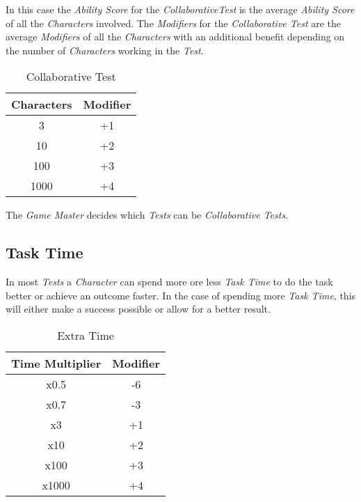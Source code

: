 In this case the \emph{Ability Score} for the \emph{CollaborativeTest} is the average
\emph{Ability Score} of all the \emph{Characters} involved. The \emph{Modifiers}
for the \emph{Collaborative Test} are the average
\emph{Modifiers} of all the \emph{Characters} with an additional benefit depending
on the number of \emph{Characters} working in the \emph{Test}.

\begin{table}[htb]
    \caption[CollaborativeTest]{Collaborative Test}
    \label{tab:team-play test}
    \centering
    \begin{tabular}{cc}
        \toprule
        \textbf{Characters} & \textbf{Modifier} \\
        \midrule
        3                   & +1                \\
        10                  & +2                \\
        100                 & +3                \\
        1000                & +4                \\
        \bottomrule
    \end{tabular}
\end{table}

The \emph{Game Master} decides which \emph{Tests} can be \emph{Collaborative Tests}.

\subsection{Task Time}

In most \emph{Tests} a \emph{Character} can spend more ore less \emph{Task Time} to
do the task better or achieve an outcome faster. In the case of spending more
\emph{Task Time}, this will either make a success possible or allow for a better
result.

\begin{table}[htb]
    \caption[Extra Time]{Extra Time}
    \label{tab:extra time}
    \centering
    \begin{tabular}{cc}
        \toprule
        \textbf{Time Multiplier} & \textbf{Modifier} \\
        \midrule
        x0.5                     & -6                \\
        x0.7                     & -3                \\
        x3                       & +1                \\
        x10                      & +2                \\
        x100                     & +3                \\
        x1000                    & +4                \\
        \bottomrule
    \end{tabular}
\end{table}

